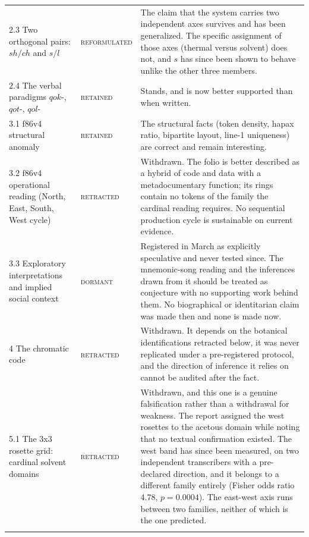 \documentclass[11pt,a4paper]{article}
\newcommand{\keep}{\textsc{retained}}
\newcommand{\reform}{\textsc{reformulated}}
\newcommand{\retract}{\textcolor{red!65!black}{\textsc{retracted}}}
\newcommand{\dormant}{\textsc{dormant}}
\begin{document}
\begin{longtable}{@{}p{4.9cm}p{2.4cm}p{7.6cm}@{}}
2.3 Two orthogonal pairs: $sh/ch$ and $s/l$ & \reform{} &
The claim that the system carries two independent axes survives and has been generalized. The
specific assignment of those axes (thermal versus solvent) does not, and $s$ has since been shown
to behave unlike the other three members. \\
\addlinespace

2.4 The verbal paradigms $qok$-, $qot$-, $qol$- & \keep{} &
Stands, and is now better supported than when written. \\
\addlinespace

3.1 f86v4 structural anomaly & \keep{} &
The structural facts (token density, hapax ratio, bipartite layout, line-1 uniqueness) are
correct and remain interesting. \\
\addlinespace

3.2 f86v4 operational reading (North, East, South, West cycle) & \retract{} &
Withdrawn. The folio is better described as a hybrid of code and data with a metadocumentary
function; its rings contain no tokens of the family the cardinal reading requires. No sequential
production cycle is sustainable on current evidence. \\
\addlinespace

3.3 Exploratory interpretations and implied social context & \dormant{} &
Registered in March as explicitly speculative and never tested since. The mnemonic-song reading and
the inferences drawn from it should be treated as conjecture with no supporting work behind them.
No biographical or identitarian claim was made then and none is made now. \\
\addlinespace

4 The chromatic code & \retract{} &
Withdrawn. It depends on the botanical identifications retracted below, it was never replicated
under a pre-registered protocol, and the direction of inference it relies on cannot be audited
after the fact. \\
\addlinespace

5.1 The 3x3 rosette grid: cardinal solvent domains & \retract{} &
Withdrawn, and this one is a genuine falsification rather than a withdrawal for weakness. The
report assigned the west rosettes to the acetous domain while noting that no textual confirmation
existed. The west band has since been measured, on two independent transcribers with a
pre-declared direction, and it belongs to a different family entirely (Fisher odds ratio 4.78,
$p = 0.0004$). The east-west axis runs between two families, neither of which is the one predicted.
\\
\addlinespace


\end{longtable}
\end{document}
